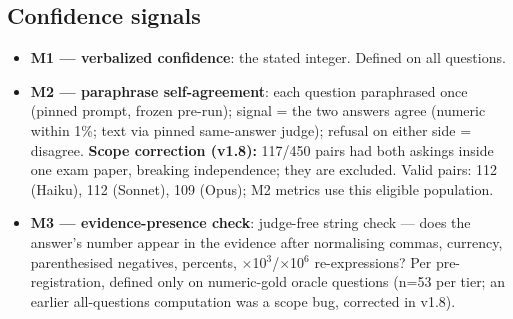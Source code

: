 \documentclass[11pt]{article}
\begin{document}
\subsection{Confidence signals}
\begin{itemize}
\item \textbf{M1 --- verbalized confidence}: the stated integer. Defined on all questions.
\item \textbf{M2 --- paraphrase self-agreement}: each question paraphrased once (pinned prompt, frozen pre-run); signal = the two answers agree (numeric within 1\%; text via pinned same-answer judge); refusal on either side = disagree. \textbf{Scope correction (v1.8):} 117/450 pairs had both askings inside one exam paper, breaking independence; they are excluded. Valid pairs: 112 (Haiku), 112 (Sonnet), 109 (Opus); M2 metrics use this eligible population.
\item \textbf{M3 --- evidence-presence check}: judge-free string check --- does the answer's number appear in the evidence after normalising commas, currency, parenthesised negatives, percents, $\times$10$^{3}$/$\times$10$^{6}$ re-expressions? Per pre-registration, defined only on numeric-gold oracle questions (n=53 per tier; an earlier all-questions computation was a scope bug, corrected in v1.8).
\end{itemize}
\end{document}
